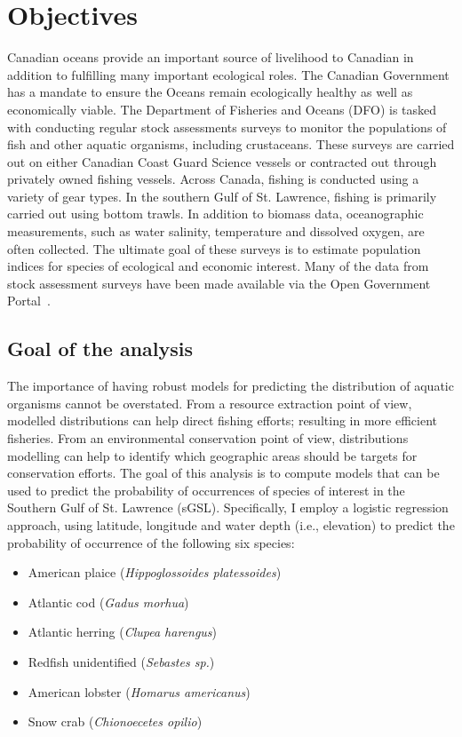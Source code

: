\section{Objectives}

Canadian oceans provide an important source of livelihood to Canadian in addition to fulfilling many important ecological roles.
The Canadian Government has a mandate to ensure the Oceans remain ecologically healthy as well as economically viable.
The Department of Fisheries and Oceans (DFO) is tasked with conducting regular stock assessments surveys to monitor the populations of fish and other aquatic
organisms, including crustaceans.
These surveys are carried out on either Canadian Coast Guard Science vessels or contracted out through privately owned fishing vessels.
Across Canada, fishing is conducted using a variety of gear types.
In the southern Gulf of St. Lawrence, fishing is primarily carried out using bottom trawls.
In addition to biomass data, oceanographic measurements, such as water salinity, temperature and dissolved oxygen, are often collected.
The ultimate goal of these surveys is to estimate population indices for species of ecological and economic interest.
Many of the data from stock assessment surveys have been made available via the Open Government Portal~\cite{ogp}.


\subsection{Goal of the analysis}

The importance of having robust models for predicting the distribution of aquatic organisms cannot be overstated.
From a resource extraction point of view, modelled distributions can help direct fishing efforts; resulting in more efficient fisheries.
From an environmental conservation point of view, distributions modelling can help to identify which geographic areas should be targets for
conservation efforts.
The goal of this analysis is to compute models that can be used to predict the probability of occurrences of species of interest in the Southern
Gulf of St. Lawrence (sGSL).
Specifically, I employ a logistic regression approach, using latitude, longitude and water depth (i.e., elevation) to predict the probability of
occurrence of the following six species:

\begin{itemize}
    \item American plaice (\textit{Hippoglossoides platessoides})
    \item Atlantic cod (\textit{Gadus morhua})
    \item Atlantic herring (\textit{Clupea harengus})
    \item Redfish unidentified (\textit{Sebastes sp.})
    \item American lobster (\textit{Homarus americanus})
    \item Snow crab (\textit{Chionoecetes opilio})
\end{itemize}

